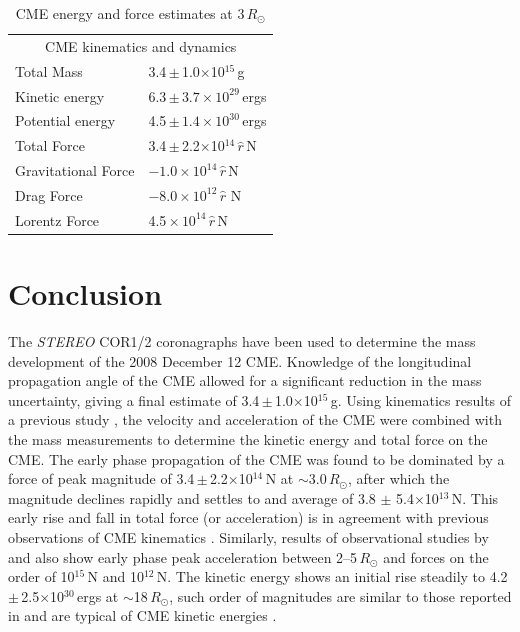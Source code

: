 \begin{table}[!t]
  \centering
\begin{tabular}{ll}
\hline
\hline
\multicolumn{2}{c}{CME kinematics and dynamics} \\
\cline{1-2}
Total Mass & 3.4\,$\pm$\,1.0$\times$10$^{15}$\,g \\
Kinetic energy & 6.3\,$\pm\,3.7\times10^{29}$\,ergs \\
Potential energy & 4.5\,$\pm\,1.4\times10^{30}$\,ergs \\
Total Force & 3.4\,$\pm$\,2.2$\times$10$^{14}\,\hat{r}$\,N \\
Gravitational Force & $-1.0\times10^{14}\,\hat{r}$\,N \\
Drag Force & $-8.0\times10^{12}\,\hat{r}\,$\,N \\
Lorentz Force & 4.5\,$\times\,10^{14}\,\hat{r}$\,N \\
\hline
\hline
\end{tabular}
\caption {CME energy and force estimates at 3\,$R_{\odot}$}
\label{tab:cme_kins}
\end{table}


 \section{Conclusion} \label{bozomath}
 The \emph{STEREO} COR1/2 coronagraphs have been used to determine the mass development of the 2008 December 12 CME. Knowledge of the longitudinal propagation angle of the CME allowed for a significant reduction in the mass uncertainty, giving a final estimate of 3.4\,$\pm$\,1.0$\times$10$^{15}$\,g. Using kinematics results of a previous study \citep{byrne2010}, the velocity and acceleration of the CME were combined with the mass measurements to determine the kinetic energy and total force on the CME. The early phase propagation of the CME was found to be dominated by a force of peak magnitude of 3.4\,$\pm$\,2.2$\times$10$^{14}$\,N at $\sim$3.0\,$R_{\odot}$, after which the magnitude declines 
rapidly and settles to and average of 3.8 $\pm$ 5.4$\times$10$^{13}$\,N. This early rise and fall in total force (or acceleration) is in agreement with previous observations of CME kinematics \citep{gallagher03, bein2011}. Similarly, results of observational studies by \citet{zhang2001} and \citet{zhang2004} also show early phase peak acceleration between 2--5\,$R_{\odot}$ and forces on the order of 10$^{15}$\,N and 10$^{12}$\,N. The kinetic energy shows an initial rise steadily to 4.2\,$\pm$\,2.5$\times$10$^{30}$\,ergs at $\sim$18\,$R_{\odot}$, such order of magnitudes are similar to those reported in \citet{vou00,emslie2004} and are typical of CME kinetic energies \citep{vour2010}.


